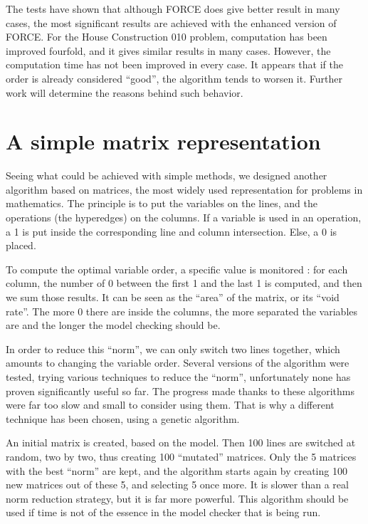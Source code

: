 \documentclass[12pt]{report}
\begin{document}
The tests have shown that although FORCE does give better result in many cases, the most significant results are achieved with the enhanced version of FORCE. For the House Construction 010 problem, computation has been improved fourfold, and it gives similar results in many cases. However, the computation time has not been improved in every case. It appears that if the order is already considered \enquote{good}, the algorithm tends to worsen it. Further work will determine the reasons behind such behavior.

\chapter{A simple matrix representation}

Seeing what could be achieved with simple methods, we designed another algorithm based on matrices, the most widely used representation for problems in mathematics. The principle is to put the variables on the lines, and the operations (the hyperedges) on the columns. If a variable is used in an operation, a 1 is put inside the corresponding line and column intersection. Else, a 0 is placed.

To compute the optimal variable order, a specific value is monitored : for each column, the number of 0 between the first 1 and the last 1 is computed, and then we sum those results. It can be seen as the \enquote{area} of the matrix, or its \enquote{void rate}. The more 0 there are inside the columns, the more separated the variables are and the longer the model checking should be.

In order to reduce this \enquote{norm}, we can only switch two lines together, which amounts to changing the variable order. Several versions of the algorithm were tested, trying various techniques to reduce the \enquote{norm}, unfortunately none has proven significantly useful so far. The progress made thanks to these algorithms were far too slow and small to consider using them. That is why a different technique has been chosen, using a genetic algorithm. 

An initial matrix is created, based on the model. Then 100 lines are switched at random, two by two, thus creating 100 \enquote{mutated} matrices. Only the 5 matrices with the best \enquote{norm} are kept, and the algorithm starts again by creating 100 new matrices out of these 5, and selecting 5 once more. It is slower than a real norm reduction strategy, but it is far more powerful. This algorithm should be used if time is not of the essence in the model checker that is being run.
\end{document}
